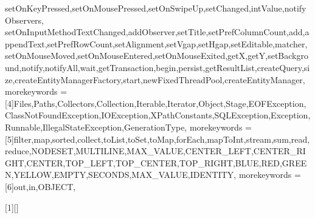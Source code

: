 {{    setOnKeyPressed,setOnMousePressed,setOnSwipeUp,setChanged,intValue,notifyObservers, setOnInputMethodTextChanged,addObserver,setTitle,setPrefColumnCount,add,appendText,setPrefRowCount,setAlignment,setVgap,setHgap,setEditable,matcher,%
    setOnMouseMoved,setOnMouseEntered,setOnMouseExited,getX,getY,setBackground,notify,notifyAll,wait,getTransaction,begin,persist,getResultList,createQuery,size,createEntityManagerFactory,start,newFixedThreadPool,createEntityManager},
    morekeywords = [4]{Files,Paths,Collectors,Collection,Iterable,Iterator,Object,Stage,EOFException,ClassNotFoundException,IOException,XPathConstants,SQLException,Exception,Runnable,IllegalStateException,GenerationType},
    morekeywords = [5]{filter,map,sorted,collect,toList,toSet,toMap,forEach,mapToInt,stream,sum,read,reduce,NODESET,MULTILINE,MAX_VALUE,CENTER_LEFT,CENTER_RIGHT,CENTER,TOP_LEFT,TOP_CENTER,TOP_RIGHT,BLUE,RED,GREEN,YELLOW,EMPTY,SECONDS,MAX_VALUE,IDENTITY},
    morekeywords = [6]{out,in,OBJECT},
}


[1][]
  {\lstset{language=lJava,#1}}
{}



